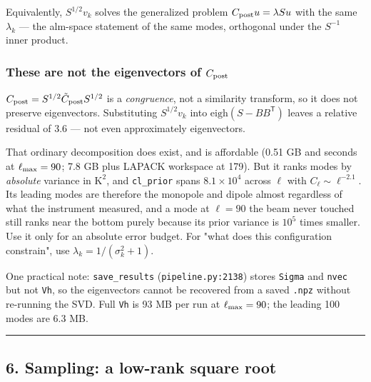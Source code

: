 \documentclass[
  11pt,
]{article}
\begin{document}
Equivalently, \(S^{1/2}v_k\) solves the generalized problem
\(C_{\rm post}u = \lambda S u\) with the same \(\lambda_k\) --- the
alm-space statement of the same modes, orthogonal under the \(S^{-1}\)
inner product.

\hypertarget{these-are-not-the-eigenvectors-of-c_rm-post}{%
\subsubsection{\texorpdfstring{These are not the eigenvectors of
\(C_{\rm post}\)}{These are not the eigenvectors of C\_\{\textbackslash rm post\}}}\label{these-are-not-the-eigenvectors-of-c_rm-post}}

\(C_{\rm post} = S^{1/2}\tilde{C}_{\rm post}S^{1/2}\) is a
\emph{congruence}, not a similarity transform, so it does not preserve
eigenvectors. Substituting \(S^{1/2}v_k\) into
\(\mathrm{eigh}(S - BB^{\mathsf T})\) leaves a relative residual of 3.6
--- not even approximately eigenvectors.

That ordinary decomposition does exist, and is affordable (0.51 GB and
seconds at \(\ell_{\rm max} = 90\); 7.8 GB plus LAPACK workspace at
179). But it ranks modes by \emph{absolute} variance in
\(\mathrm{K}^2\), and \texttt{cl\_prior} spans \(8.1\times10^4\) across
\(\ell\) with \(C_\ell \sim \ell^{-2.1}\). Its leading modes are
therefore the monopole and dipole almost regardless of what the
instrument measured, and a mode at \(\ell = 90\) the beam never touched
still ranks near the bottom purely because its prior variance is
\(10^5\) times smaller. Use it only for an absolute error budget. For
"what does this configuration constrain", use
\(\lambda_k = 1/(\sigma_k^2+1)\).

One practical note: \texttt{save\_results} (\texttt{pipeline.py:2138})
stores \texttt{Sigma} and \texttt{nvec} but not \texttt{Vh}, so the
eigenvectors cannot be recovered from a saved \texttt{.npz} without
re-running the SVD. Full \texttt{Vh} is 93 MB per run at
\(\ell_{\rm max} = 90\); the leading 100 modes are 6.3 MB.

\begin{center}\rule{0.5\linewidth}{0.5pt}\end{center}

\hypertarget{6-sampling-a-low-rank-square-root}{%
\subsection{6. Sampling: a low-rank square
root}\label{6-sampling-a-low-rank-square-root}}
\end{document}
